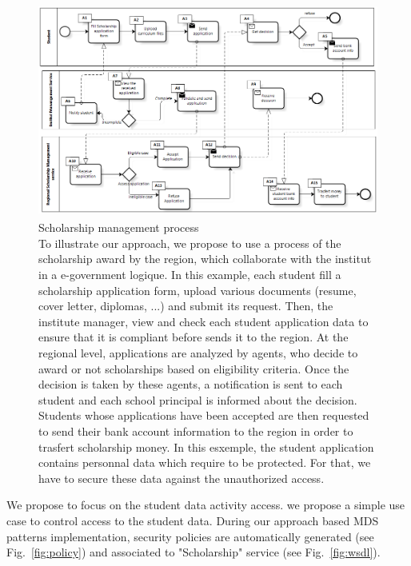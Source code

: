 \documentclass[runningheads,a4paper]{llncs}
\begin{document}
\begin{figure}  
\centering
\includegraphics[height=200pt, width=320pt]{BRPE_Eng1.png}
\caption[Scholarship management process]{Scholarship management process\\ To illustrate our approach, we propose to use a process of the scholarship award by the region, which collaborate with the institut in a e-government logique. In this example, each student fill a scholarship application form, upload various documents (resume, cover letter, diplomas, ...) and submit its request. Then, the institute manager, view and check each student application data to ensure that it is compliant before sends it to the region. At the regional level, applications are analyzed by agents, who decide to award or not scholarships based on eligibility criteria. Once the decision is taken by these agents, a notification is sent to each student and each school principal is informed about the decision. Students whose applications have been accepted are then requested to send their bank account information to the region in order to trasfert scholarship money.
In this esxemple, the student application contains personnal data which require to be protected. For that, we have to secure these data against the unauthorized access.  }
\label{fig:bp}
\end{figure}


We propose to focus on the student data activity access. 
we propose a simple use case to control access to the student data. During our approach based MDS patterns implementation, security policies are automatically generated (see Fig.~\ref{fig:policy}) and associated to "Scholarship" service (see Fig.~\ref{fig:wsdl}).
\end{document}
